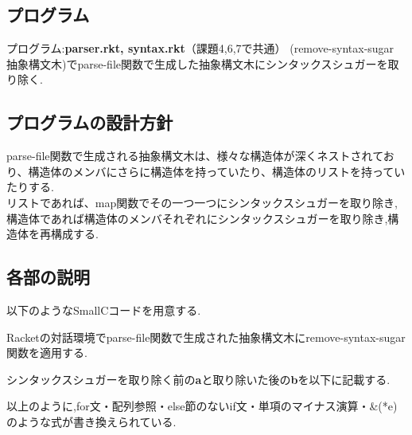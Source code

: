 \subsection{プログラム}
プログラム:\textbf{parser.rkt, syntax.rkt}（課題4,6,7で共通）
(remove-syntax-sugar 抽象構文木)でparse-file関数で生成した抽象構文木にシンタックスシュガーを取り除く.
\subsection{プログラムの設計方針}
parse-file関数で生成される抽象構文木は、様々な構造体が深くネストされており、構造体のメンバにさらに構造体を持っていたり、構造体のリストを持っていたりする.\\
リストであれば、map関数でその一つ一つにシンタックスシュガーを取り除き,構造体であれば構造体のメンバそれぞれにシンタックスシュガーを取り除き,構造体を再構成する.
\subsection{各部の説明}
以下のようなSmallCコードを用意する.

Racketの対話環境でparse-file関数で生成された抽象構文木にremove-syntax-sugar関数を適用する.

シンタックスシュガーを取り除く前の\textbf{a}と取り除いた後の\textbf{b}を以下に記載する.


以上のように,for文・配列参照・else節のないif文・単項のマイナス演算・\&(*e)のような式が書き換えられている.